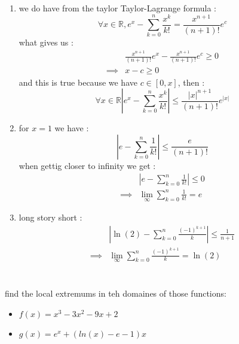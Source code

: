 \documentclass[12pt]{article}
\begin{document}
\begin{correctionbox}
	\begin{enumerate}
		\item we do have from the taylor Taylor-Lagrange formula :
		      $$\forall x \in \mathbb{R}, e^x - \sum_{k =0}^{n} \frac{x^k}{k!} = \frac{x^{n+1}}{(n+1)!} e^{c}$$
		      what gives us :
		      \begin{align*}
			               & \frac{x^{n+1}}{(n+1)!} e^{x} -  \frac{x^{n+1}}{(n+1)!} e^{c}  \ge 0 \\
			      \implies & x  - c                                              \ge 0
		      \end{align*}
		      and this is true because we have $c \in [0,x]$,
		      then :
		      $$\forall x \in \mathbb{R} \left|e^x - \sum_{k =0}^{n} \frac{x^k}{k!} \right| \le \frac{|x|^{n+1}}{(n+1)!} e^{|x|}$$
		\item for $x = 1$ we have :
		      $$\left|e - \sum_{k =0}^{n} \frac{1}{k!} \right| \le \frac{e}{(n+1)!}$$
		      when gettig closer to infinity we get :
		      \begin{align*}
			               & \left|e - \sum_{k =0}^{n} \frac{1}{k!} \right| \le 0 \\
			      \implies & \lim_{\infty} \sum_{k =0}^{n} \frac{1}{k!} = e
		      \end{align*}
		\item long story short :
		      \begin{align*}
			               & \left|\ln(2) - \sum_{k =0}^{n} \frac{(-1)^{k+1}}{k} \right| \le \frac{1}{n+1} \\
			      \implies & \lim_{\infty} \sum_{k =0}^{n} \frac{(-1)^{k+1}}{k} = \ln(2)
		      \end{align*}
	\end{enumerate}
\end{correctionbox}

\section{}
find the local extremums in teh domaines of those functions:
\begin{itemize}
	\item $f(x) = x^3 - 3x^2 - 9x +2$
	\item $g(x) = e^x + (ln(x) - e - 1)x$
\end{itemize}
\end{document}
